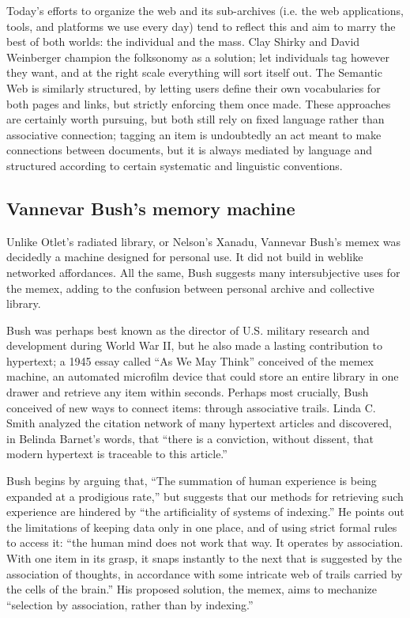 Today's efforts to organize the web and its sub-archives (i.e. the web applications, tools, and platforms we use every day) tend to reflect this and aim to marry the best of both worlds: the individual and the mass. Clay Shirky and David Weinberger champion the folksonomy as a solution; let individuals tag however they want, and at the right scale everything will sort itself out.\autocites{shirky_ontology_2005}[165-8]{weinberger_everything_2008} The Semantic Web is similarly structured, by letting users define their own vocabularies for both pages and links, but strictly enforcing them once made.  These approaches are certainly worth pursuing, but both still rely on fixed language rather than associative connection; tagging an item is undoubtedly an act meant to make connections between documents, but it is always mediated by language and structured according to certain systematic and linguistic conventions.

\subsection{Vannevar Bush's memory machine}

Unlike Otlet's radiated library, or Nelson's Xanadu, Vannevar Bush's memex was decidedly a machine designed for personal use. It did not build in weblike networked affordances. All the same, Bush suggests many intersubjective uses for the memex, adding to the confusion between personal archive and collective library.

Bush was perhaps best known as the director of U.S. military research and development during World War II, but he also made a lasting contribution to hypertext; a 1945 essay called ``As We May Think'' conceived of the memex machine, an automated microfilm device that could store an entire library in one drawer and retrieve any item within seconds.\autocite{bush_as_1945} Perhaps most crucially, Bush conceived of new ways to connect items: through associative trails. Linda C. Smith analyzed the citation network of many hypertext articles and discovered, in Belinda Barnet's words, that ``there is a conviction, without dissent, that modern hypertext is traceable to this article.''\autocite{barnet_technical_2008}

Bush begins by arguing that, ``The summation of human experience is being expanded at a prodigious rate,'' but suggests that our methods for retrieving such experience are hindered by ``the artificiality of systems of indexing.''\autocite{bush_as_1945} He points out the limitations of keeping data only in one place, and of using strict formal rules to access it: ``the human mind does not work that way. It operates by association. With one item in its grasp, it snaps instantly to the next that is suggested by the association of thoughts, in accordance with some intricate web of trails carried by the cells of the brain.'' His proposed solution, the memex, aims to mechanize ``selection by association, rather than by indexing.''\autocite{bush_as_1945}

